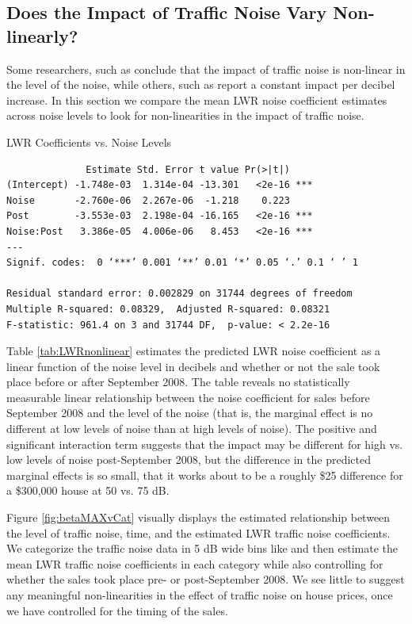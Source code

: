 \documentclass{article}\usepackage{graphicx, color}
\begin{document}
\subsection{Does the Impact of Traffic Noise Vary Non-linearly?}

Some researchers, such as \citet{Theebe2004a} conclude that the impact of traffic noise is non-linear in the level of the noise, while others, such as \citet{Huang;Palmquist2001} report a constant impact per decibel increase. In this section we compare the mean LWR noise coefficient estimates across noise levels to look for non-linearities in the impact of traffic noise.

\begin{table}
\caption{LWR Coefficients vs. Noise Levels}\label{tab:LWRnonlinear}
\begin{verbatim}
              Estimate Std. Error t value Pr(>|t|)    
(Intercept) -1.748e-03  1.314e-04 -13.301   <2e-16 ***
Noise       -2.760e-06  2.267e-06  -1.218    0.223    
Post        -3.553e-03  2.198e-04 -16.165   <2e-16 ***
Noise:Post   3.386e-05  4.006e-06   8.453   <2e-16 ***
---
Signif. codes:  0 ‘***’ 0.001 ‘**’ 0.01 ‘*’ 0.05 ‘.’ 0.1 ‘ ’ 1 

Residual standard error: 0.002829 on 31744 degrees of freedom
Multiple R-squared: 0.08329,  Adjusted R-squared: 0.08321 
F-statistic: 961.4 on 3 and 31744 DF,  p-value: < 2.2e-16 
\end{verbatim}
\end{table}

Table \ref{tab:LWRnonlinear} estimates the predicted LWR noise coefficient as a linear function of the noise level in decibels and whether or not the sale took place before or after September 2008. The table reveals no statistically measurable linear relationship between the noise coefficient for sales before September 2008 and the level of the noise (that is, the marginal effect is no different at low levels of noise than at high levels of noise). The positive and significant interaction term suggests that the impact may be different for high vs. low levels of noise post-September 2008, but the difference in the predicted marginal effects is so small, that it works about to be a roughly \$25 difference for a \$300,000 house at 50 vs. 75 dB. 

Figure \ref{fig:betaMAXvCat} visually displays the estimated relationship between the level of traffic noise, time, and the estimated LWR traffic noise coefficients. We categorize the traffic noise data in 5 dB wide bins like \citet{Theebe2004a} and then estimate the mean LWR traffic noise coefficients in each category while also controlling for whether the sales took place pre- or post-September 2008. We see little to suggest any meaningful non-linearities in the effect of traffic noise on house prices, once we have controlled for the timing of the sales.
\end{document}
